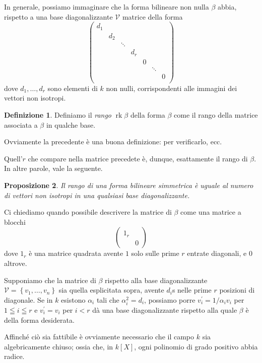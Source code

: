 \documentclass[a4paper]{amsproc}
\theoremstyle{plain}
\newtheorem{prp}{Proposizione}[section]
\theoremstyle{definition}
\newtheorem{dfn}[prp]{Definizione}
\theoremstyle{remark}
\DeclareMathOperator{\rk}{rk}
\begin{document}
In generale, possiamo immaginare che la forma bilineare non nulla $ \beta $ abbia, rispetto a una base diagonalizzante $ \mathcal V $ matrice della forma
\[
  \left(%
    \begin{smallmatrix}
      d_1 & {} & {} & {} & {} & {} & {}\\
      {} & d_2 & {} & {} & {}& {}& {}\\
      {} & {} & \ddots & {} & {} & {}& {}\\
      {} & {} & {} & d_r & {} & {} & {}\\
      {} & {} & {} & {} & 0 & {} & {}\\
      {} & {} & {} & {} & {} & \ddots & {}\\
      {} & {} & {} & {} & {} & {} & 0\\
    \end{smallmatrix}
  \right)
\]
dove $ d_1,\dots,d_r $ sono elementi di $ k $ non nulli, corrispondenti alle immagini dei vettori non isotropi.

\begin{dfn}
  Definiamo il \emph{rango} $ \rk\beta $ della forma $ \beta $ come il rango della matrice associata a $ \beta $ in qualche base.
\end{dfn}

Ovviamente la precedente è una buona definizione: per verificarlo, ecc.

Quell'$ r $ che compare nella matrice precedete è, dunque, esattamente il rango di $ \beta $. In altre parole, vale la seguente.

\begin{prp}
  Il rango di una forma bilineare simmetrica è uguale al numero di vettori non isotropi in una qualsiasi base diagonalizzante.
\end{prp}

Ci chiediamo quando possibile descrivere la matrice di $ \beta $ come una matrice a blocchi
\[
  \left(%
    \begin{smallmatrix}
      1_r & {}\\
      {} & 0
    \end{smallmatrix}
  \right)
\]
dove $ 1_r $ è una matrice quadrata avente $ 1 $ solo sulle prime $ r $ entrate diagonali, e $ 0 $ altrove.

Supponiamo che la matrice di $ \beta $ rispetto alla base diagonalizzante $ \mathcal V = \left\{v_1,\dots,v_n\right\} $ sia quella esplicitata sopra, avente $ d_i $s nelle prime $ r $ posizioni di diagonale. Se in $ k $ esistono $ \alpha_i $ tali che $ \alpha_i^2 = d_i $, possiamo porre $ v_i^\prime = 1/\alpha_iv_i $ per $ 1\leqq i\leqq r $ e $ v_i^\prime = v_i $ per $ i<r $ dà una base diagonalizzante rispetto alla quale $ \beta $ è della forma desiderata.

Affinché ciò sia fattibile è ovviamente necessario che il campo $ k $ sia algebricamente chiuso; ossia che, in $ k[X] $, ogni polinomio di grado positivo abbia radice.


\clearpage
\printbibliography[] %
\end{document}
